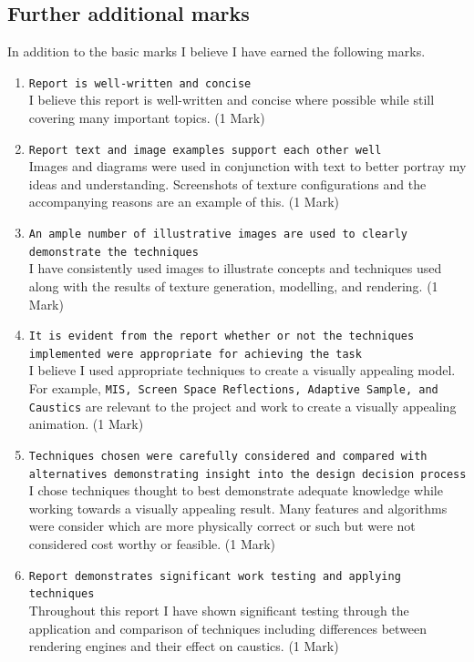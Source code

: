 \documentclass[11pt]{article}
\begin{document}
\subsection{Further additional marks}
\label{sec:orgd39f525}
In addition to the basic marks I believe I have earned the following marks.
\begin{enumerate}
\item \texttt{Report is well-written and concise}\\
I believe this report is well-written and concise where possible while still covering many
important topics. (1 Mark)
\item \texttt{Report text and image examples support each other well}\\
Images and diagrams were used in conjunction with text to better portray my
ideas and understanding. Screenshots of texture configurations and the
accompanying reasons are an example of this. (1 Mark)
\item \texttt{An ample number of illustrative images are used to clearly demonstrate the
   techniques}\\
I have consistently used images to illustrate concepts and techniques used
along with the results of texture generation, modelling, and rendering. (1 Mark)
\item \texttt{It is evident from the report whether or not the techniques implemented
   were appropriate for achieving the task}\\
I believe I used appropriate techniques to create a visually appealing
model. For example, \texttt{MIS, Screen Space Reflections, Adaptive Sample,
   and Caustics} are relevant to the project and work to create a visually
appealing animation. (1 Mark)
\item \texttt{Techniques chosen were carefully considered and compared with alternatives
   demonstrating insight into the design decision process}\\
I chose techniques thought to best demonstrate adequate knowledge while
working towards a visually appealing  result. Many features and algorithms
were consider which are more physically correct or such but were not considered cost
worthy or feasible. (1 Mark)
\item \texttt{Report demonstrates significant work testing and applying techniques}\\
Throughout this report I have shown significant testing through the
application and comparison of techniques including differences between
rendering engines and their effect on caustics. (1 Mark)

\end{enumerate}
\end{document}
